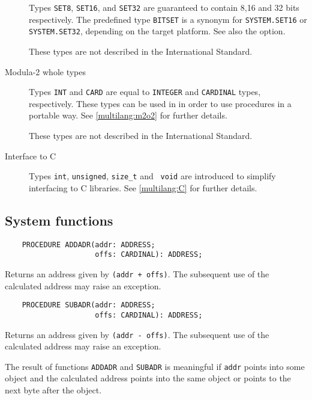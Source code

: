 \begin{description}
        Types {\tt SET8}, {\tt SET16}, and {\tt SET32} are guaranteed
        to contain 8,16 and 32 bits respectively.
        The predefined type \verb'BITSET' is a synonym for
        \verb'SYSTEM.SET16' or \verb'SYSTEM.SET32', depending
        on the target platform. See also the  option.

        These types are not described in the International
        Standard.

\item[Modula-2 whole types] \mbox{}

        Types {\tt INT} and {\tt CARD} are equal to \mt{} {\tt INTEGER}
        and {\tt CARDINAL} types, respectively. These types can
        be used in \ot{} in order to use \mt{} procedures
        in a portable way. See \ref{multilang:m2o2} for further details.

        These types are not described in the International
        Standard.

\item[Interface to C] \mbox{}

        Types  {\tt int},  {\tt unsigned}, \verb|size_t| and {\tt
        void} are introduced to simplify interfacing to C
        libraries. See \ref{multilang:C} for further details.

\end{description}

\subsection{System functions}\label{m2:sysfunc}


\verb'    PROCEDURE ADDADR(addr: ADDRESS;'\\
\verb'                     offs: CARDINAL): ADDRESS;'

Returns an address given by {\tt (addr + offs)}.
The subsequent use of the calculated address may raise an exception.

\verb'    PROCEDURE SUBADR(addr: ADDRESS;'\\
\verb'                     offs: CARDINAL): ADDRESS;'

Returns an address given by {\tt (addr - offs)}.
The subsequent use of the calculated address may raise an exception.

\ifgenc
The result of functions {\tt ADDADR} and {\tt SUBADR} is meaningful
if {\tt addr} points into some object and the calculated address
points into the same object or points to the next byte after
the object.
\fi

